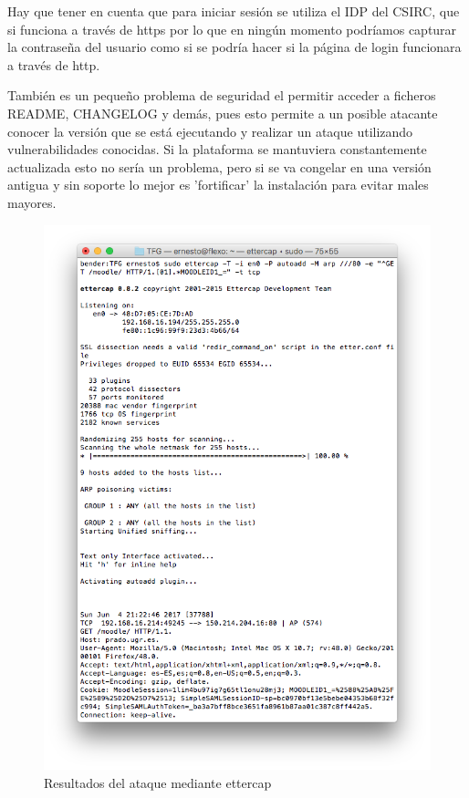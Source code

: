 \bigskip
Hay que tener en cuenta que para iniciar sesión se utiliza el IDP del CSIRC, que si funciona a través de https por lo que en ningún momento podríamos capturar la contraseña del usuario como si se podría hacer si la página de login funcionara a través de http.

\bigskip
También es un pequeño problema de seguridad el permitir acceder a ficheros README, CHANGELOG y demás, pues esto permite a un posible atacante conocer la versión que se está ejecutando y realizar un ataque utilizando vulnerabilidades conocidas. Si la plataforma se mantuviera constantemente actualizada esto no sería un problema, pero si se va congelar en una versión antigua y sin soporte lo mejor es 'fortificar' la instalación para evitar males mayores.

\begin{figure}[H]
\centering
\includegraphics[width=1.0\textwidth]{../screenshots/ettercap}
\caption{Resultados del ataque mediante ettercap}
\label{fig:ettercap}
\end{figure}



